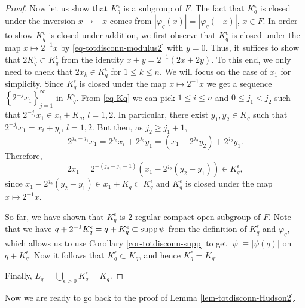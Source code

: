 \documentclass[12pt,reqno]{amsart}
\theoremstyle{definition}
\theoremstyle{definition}
\theoremstyle{definition}
\numberwithin{thm}{section}
\numberwithin{equation}{section}
\newcommand{\set}[1]{\left\{#1\right\}}
\begin{document}
\begin{proof}
Now let us show that $K_q^{\epsilon}$ is a subgroup of $F$. The fact that $K_q^{\epsilon}$ is closed under the inversion $x\mapsto -x$ comes from $|\varphi_q(x)|=|\varphi_q(-x)|$, $x\in F$. In order to show $K_q^{\epsilon}$ is closed under addition, we first observe that $K_q^{\epsilon}$ is closed under the map $x\mapsto 2^{-1}x$ by \eqref{eq-totdisconn-modulus2} with $y=0$. Thus, it suffices to show that $2K_q^{\epsilon}\subset K_q^{\epsilon}$ from the identity $x+y=2^{-1}(2x+2y)$. To this end, we only need to check that $2x_k\in K_q^{\epsilon}$ for $1\le k\le n$.
We will focus on the case of $x_1$ for simplicity.
Since $K_q^{\epsilon}$ is closed under the map $x\mapsto 2^{-1}x$ we get a sequence $\set{2^{-j}x_1}_{j=1}^{\infty}$ in $K_q^{\epsilon}$. From \eqref{eq-Kq} we can pick $1\le i\le n$ and $0\leq j_1<j_2$ such that $2^{-j_l}x_1\in x_i+K_q$, $l=1,2$. In particular, there exist $y_1, y_2\in K_q$ such that $2^{-j_l}x_1=x_i + y_l$, $l=1,2$. But then, as $j_2\geq j_1+1$,
    $$2^{j_2-j_1}x_1=2^{j_2}x_i+2^{j_2}y_1=(x_1-2^{j_2}y_2)+2^{j_2}y_1.$$
Therefore,
    $$2x_1=2^{-(j_2-j_1-1)}(x_1-2^{j_2}(y_2-y_1))\in K_q^{\epsilon},$$
since $x_1-2^{j_2}(y_2-y_1)\in x_1+K_q\subset K_q^{\epsilon}$ and $K_q^{\epsilon}$ is closed under the map $x\mapsto 2^{-1}x$.

So far, we have shown that $K_q^{\epsilon}$ is 2-regular compact open subgroup of $F$. Note that we have $q+2^{-1}K_q^{\epsilon}=q+K_q^{\epsilon}\subset {\rm supp}\,\psi$ from the definition of $K_q^{\epsilon}$ and $\varphi_q$, which allows us to use Corollary \ref{cor-totdisconn-supp} to get $|\psi|\equiv |\psi(q)|$ on $q+K_q^{\epsilon}$. Now it follows that $K_q^{\epsilon}\subset  K_q$, and hence $K_q^{\epsilon}=K_q$.

Finally, $L_q=\bigcup_{\epsilon>0}K_q^{\epsilon}=K_q$.
\end{proof}

Now we are ready to go back to the proof of Lemma \ref{lem-totdisconn-Hudson2}.
\end{document}
